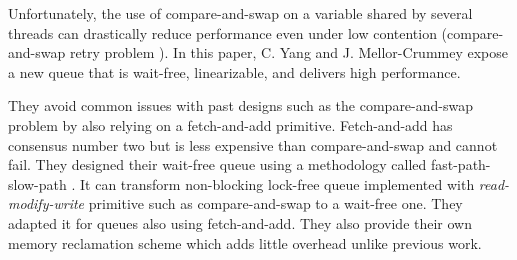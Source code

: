  Unfortunately, the use of compare-and-swap on a variable
shared by several threads can drastically reduce performance even under low
contention (compare-and-swap retry problem
\cite{Morrison:2013:FCQ:2517327.2442527}). In this paper, C. Yang and J.
Mellor-Crummey expose a new queue that is wait-free, linearizable, and delivers
high performance.

They avoid common issues with past designs such as the compare-and-swap problem
by also relying on a fetch-and-add primitive. Fetch-and-add has consensus number
two but is less expensive than compare-and-swap and cannot fail. They designed
their wait-free queue using a methodology called fast-path-slow-path
\cite{Kogan:2012:MCF:2370036.2145835}. It can transform non-blocking lock-free
queue implemented with \textit{read-modify-write} primitive such as
compare-and-swap to a wait-free one. They adapted it for queues also using
fetch-and-add. They also provide their own memory reclamation scheme which adds
little overhead unlike previous work.
